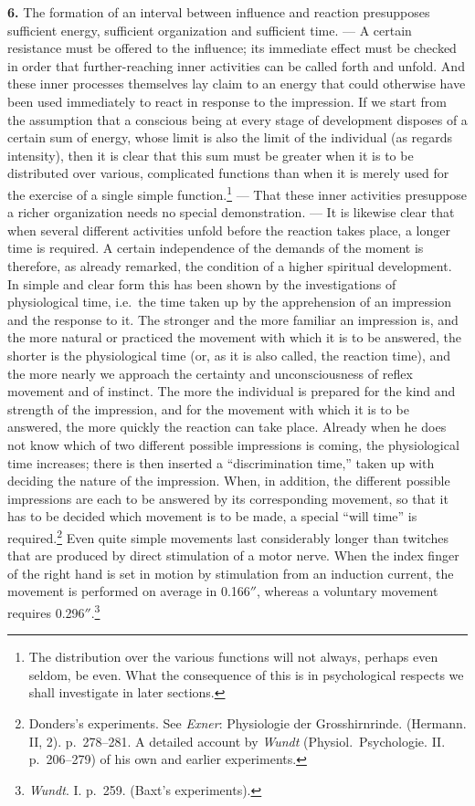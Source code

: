 \documentclass[12pt,a4paper]{book}
\newcommand{\opage}[1]{\marginnote{\footnotesize\textit{[#1]}}}
\begin{document}
\textbf{6.} The formation of an interval between influence and reaction
presupposes sufficient energy, sufficient organization and sufficient
time. --- A certain resistance must be offered to the influence; its
immediate effect must be checked in order that further-reaching inner
activities can be called forth and unfold. And these inner
\opage{111}processes themselves lay claim to an energy that could
otherwise have been used immediately to react in response to the
impression. If we start from the assumption that a conscious being at
every stage of development disposes of a certain sum of energy, whose
limit is also the limit of the individual (as regards intensity), then it
is clear that this sum must be greater when it is to be distributed over
various, complicated functions than when it is merely used for the
exercise of a single simple
function.\footnote{The distribution over the various functions will not
always, perhaps even seldom, be even. What the consequence of this is in
psychological respects we shall investigate in later sections.} --- That
these inner activities presuppose a richer organization needs no special
demonstration. --- It is likewise clear that when several different
activities unfold before the reaction takes place, a longer time is
required. A certain independence of the demands of the moment is
therefore, as already remarked, the condition of a higher spiritual
development. In simple and clear form this has been shown by the
investigations of physiological time, i.e.\ the time taken up by the
apprehension of an impression and the response to it. The stronger and
the more familiar an impression is, and the more natural or practiced the
movement with which it is to be answered, the shorter is the
physiological time (or, as it is also called, the reaction time), and the
more nearly we approach the certainty and unconsciousness of reflex
movement and of instinct. The more the individual is prepared for the
kind and strength of the impression, and for the movement with which it
is to be answered, the more quickly the reaction can take place. Already
when he does not know which of two different possible impressions is
coming, the physiological time increases; there is then inserted a
``discrimination time,'' taken up with deciding the nature of the
impression. When, in addition, the different possible impressions are
each to be answered by its corresponding movement, so that it has to be
decided which movement is to be made, a special
``will time'' is required.\footnote{Donders's experiments. See
\emph{Exner}: Physiologie der Grosshirnrinde. (Hermann. II, 2).
p.~278--281. A detailed account by \emph{Wundt} (Physiol.\ Psychologie.
II. p.~206--279) of his own and earlier experiments.} Even quite simple
movements last considerably longer than twitches that are
\opage{112}produced by direct stimulation of a motor nerve. When the index
finger of the right hand is set in motion by stimulation from an
induction current, the movement is performed on average in
0.166$''$, whereas a voluntary movement requires
0.296$''$.\footnote{\emph{Wundt}. I. p.~259. (Baxt's experiments).}
\end{document}
